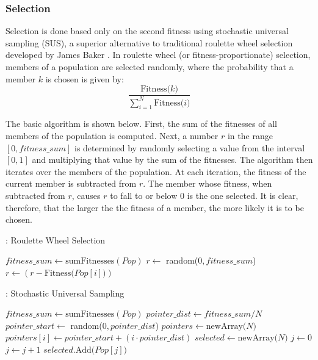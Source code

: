 \documentclass[11pt]{article}
\begin{document}
\subsubsection{Selection}

Selection is done based only on the second fitness using stochastic universal sampling (SUS), a superior alternative to traditional roulette wheel selection developed by James Baker \cite{j_reducing_1987}. In roulette wheel (or fitness-proportionate) selection, members of a population are selected randomly, where the probability that a member $k$ is chosen is given by:
$$ \frac{\text{Fitness($k$)}}{\sum_{i=1}^N\text{Fitness($i$)}}$$

The basic algorithm is shown below. First, the sum of the fitnesses of all members of the population is computed. Next, a number $r$ in the range $[0, fitness\_sum]$ is determined by randomly selecting a value from the interval $[0,1]$ and multiplying that value by the sum of the fitnesses. The algorithm then iterates over the members of the population. At each iteration, the fitness of the current member is subtracted from $r$. The member whose fitness, when subtracted from $r$, causes $r$ to fall to or below 0 is the one selected. It is clear, therefore, that the larger the the fitness of a member, the more likely it is to be chosen.

\begin{algorithm}
\caption{: Roulette Wheel Selection}
\label{rws}
\begin{algorithmic}
\State $fitness\_sum \gets \text{sumFitnesses}(Pop)$
\State $r \gets$ random($0,fitness\_sum$)
\State $r \gets (r - \text{Fitness($Pop[i]$)})$
\State {}
\EndIf
\EndFor
\State {}
\EndFunction
\end{algorithmic}
\end{algorithm}

\begin{algorithm}
\caption{: Stochastic Universal Sampling}
\label{sus}
\begin{algorithmic}
\State $fitness\_sum \gets \text{sumFitnesses}(Pop)$
\State $pointer\_dist \gets fitness\_sum/N$
\State $pointer\_start \gets$ random($0,pointer\_dist$)
\State $pointers \gets \text{newArray($N $)}$
\State $pointers[i] \gets pointer\_start + (i \cdot pointer\_dist)$
\EndFor
\State $selected \gets \text{newArray($N$)}$
\State $j \gets 0$
\State $j \gets j + 1$
\EndWhile
\State $selected.\text{Add($Pop[j]$)}$
\EndFor
\EndFunction
\end{algorithmic}
\end{algorithm}
\end{document}
